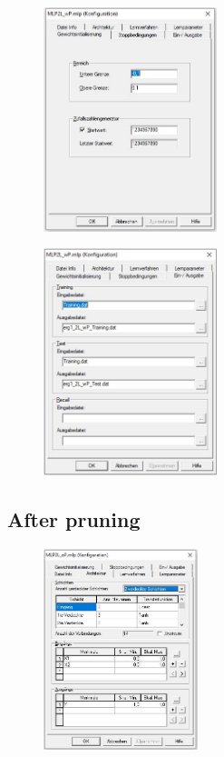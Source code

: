 \documentclass{article}
\begin{document}
\begin{doublespacing}
\begin{appendices}
\begin{figure}[H] 
    \centering
    \includegraphics[width=0.45\textwidth]{Images/Photos/WeightInitializationWP.JPG} 
\end{figure}

\begin{figure}[H] 
    \centering
    \includegraphics[width=0.45\textwidth]{Images/Photos/OutputsWP.JPG} 
\end{figure}
\vspace{10mm}

\subsection{After pruning}

\begin{figure}[H] 
    \centering
    \includegraphics[width=0.40\textwidth]{Images/Photos/ArchOP.JPG} 
\end{figure}


\end{appendices}
\end{doublespacing}
\end{document}
